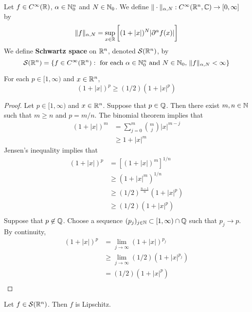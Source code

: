 \documentclass{book}
\begin{document}
	\begin{defn}
		 Let $f \in C^{\infty}(\mathbb{R})$, $\alpha \in \mathbb{N}_0^n$ and $N \in \mathbb{N}_0$. We define $\| \cdot \|_{\alpha, N}: C^{\infty}(\mathbb{R}^n, \mathbb{C}) \rightarrow [0,\infty]$ by 
		$$\|f\|_{\alpha, N} = \sup_{x \in \mathbb{R}} \bigg[  (1 + |x|)^N |\partial^{\alpha}f (x)| \bigg] $$
		We define \textbf{Schwartz space} on $\mathbb{R}^n$, denoted $\mathcal{S}(\mathbb{R}^n)$, by $$\mathcal{S}(\mathbb{R}^n) = \{f \in C^{\infty}(\mathbb{R}^n): \text{ for each $\alpha \in \mathbb{N}_0^n$ and $N \in  \mathbb{N}_0$, } \|f\|_{\alpha, N} < \infty\}$$
	\end{defn}

	\begin{ex}
		For each $p \in [1, \infty)$ and $x \in \mathbb{R}^n$, 
		$$(1 + |x|)^p \geq (1/2) (1 + |x|^p)$$
	\end{ex}
	
	\begin{proof}
		Let $p \in [1, \infty)$ and $x \in \mathbb{R}^n$. Suppose that $p \in \mathbb{Q}$. Then there exist $m,n \in \mathbb{N}$ such that $m \geq n$ and $p = m/n$. The binomial theorem implies that 
		\begin{align*}
			(1 + |x|)^m
			& = \sum_{j=0}^{m} {m \choose j}|x|^{m-j} \\
			& \geq 1 + |x|^m
		\end{align*} 
		Jensen's inequality implies that 
		\begin{align*}
			(1 + |x|)^p
			& = [(1 + |x|)^m]^{1/n} \\
			& \geq (1 + |x|^m)^{1/n} \\
			& \geq (1/2)^{\frac{n-1}{n}} (1 + |x|^p) \\
			& \geq (1/2) (1 + |x|^p) \\
		\end{align*}
		Suppose that $p \not \in \mathbb{Q}$. Choose a sequence $(p_j)_{j \in \mathbb{N}} \subset [1, \infty) \cap \mathbb{Q}$ such that $p_j \rightarrow p$. By continuity, 
		\begin{align*}
			(1 + |x|)^p
			& = \lim_{j \rightarrow \infty} (1 + |x|)^{p_j} \\
			& \geq \lim_{j \rightarrow \infty} (1/2) (1 + |x|^{p_j}) \\
			& = (1/2) (1 + |x|^p) \\
		\end{align*}
	\end{proof}

	\begin{ex}
		 Let $f \in \mathcal{S}(\mathbb{R}^n)$. Then $f$ is Lipschitz.
	\end{ex}
	
\end{document}

